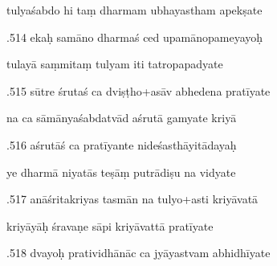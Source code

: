 \documentclass[article,12pt,a4paper]{memoir}%
\newcounter{parCount}
\begin{document}
	  
	  \pstart \leavevmode%
	tulyaśabdo hi taṃ dharmam ubhayastham apekṣate 
	{}
	\pend%
      

	  
	  \pstart {}.514 ekaḥ samāno dharmaś ced upamānopameyayoḥ 
	{}
	\pend%
      

	  
	  \pstart \leavevmode%
	tulayā saṃmitaṃ tulyam iti tatropapadyate 
	{}
	\pend%
      

	  
	  \pstart {}.515 sūtre śrutaś ca dviṣṭho+asāv abhedena pratīyate 
	{}
	\pend%
      

	  
	  \pstart \leavevmode%
	na ca sāmānyaśabdatvād aśrutā gamyate kriyā 
	{}
	\pend%
      

	  
	  \pstart {}.516 aśrutāś ca pratīyante nideśasthāyitādayaḥ 
	{}
	\pend%
      

	  
	  \pstart \leavevmode%
	ye dharmā niyatās teṣāṃ putrādiṣu na vidyate 
	{}
	\pend%
      

	  
	  \pstart {}.517 anāśritakriyas tasmān na tulyo+asti kriyāvatā 
	{}
	\pend%
      

	  
	  \pstart \leavevmode%
	kriyāyāḥ śravaṇe sāpi kriyāvattā pratīyate 
	{}
	\pend%
      

	  
	  \pstart {}.518 dvayoḥ pratividhānāc ca jyāyastvam abhidhīyate 
	{}
	\pend%
      
\end{document}
